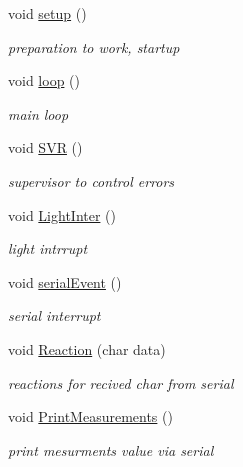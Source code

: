 \begin{DoxyCompactItemize}
\item 
\mbox{\label{_arduino_8ino_a4fc01d736fe50cf5b977f755b675f11d}} 
void \hyperlink{_arduino_8ino_a4fc01d736fe50cf5b977f755b675f11d}{setup} ()
\begin{DoxyCompactList}\small\item\em preparation to work, startup \end{DoxyCompactList}\item 
\mbox{\label{_arduino_8ino_afe461d27b9c48d5921c00d521181f12f}} 
void \hyperlink{_arduino_8ino_afe461d27b9c48d5921c00d521181f12f}{loop} ()
\begin{DoxyCompactList}\small\item\em main loop \end{DoxyCompactList}\item 
\mbox{\label{_arduino_8ino_ab68e0fadbdf08bac0bac225684590691}} 
void \hyperlink{_arduino_8ino_ab68e0fadbdf08bac0bac225684590691}{S\+VR} ()
\begin{DoxyCompactList}\small\item\em supervisor to control errors \end{DoxyCompactList}\item 
\mbox{\label{_arduino_8ino_a0fa4431e3bcdb9b59211aa7b7cb0c913}} 
void \hyperlink{_arduino_8ino_a0fa4431e3bcdb9b59211aa7b7cb0c913}{Light\+Inter} ()
\begin{DoxyCompactList}\small\item\em light intrrupt \end{DoxyCompactList}\item 
\mbox{\label{_arduino_8ino_aa11606a63bbe57842b51321e714a8daf}} 
void \hyperlink{_arduino_8ino_aa11606a63bbe57842b51321e714a8daf}{serial\+Event} ()
\begin{DoxyCompactList}\small\item\em serial interrupt \end{DoxyCompactList}\item 
void \hyperlink{_arduino_8ino_a3640ee72ee61eaba275b032cfce4f023}{Reaction} (char data)
\begin{DoxyCompactList}\small\item\em reactions for recived char from serial \end{DoxyCompactList}\item 
\mbox{\label{_arduino_8ino_a6d27cb0438359d299b4e536208457cc9}} 
void \hyperlink{_arduino_8ino_a6d27cb0438359d299b4e536208457cc9}{Print\+Measurements} ()
\begin{DoxyCompactList}\small\item\em print mesurments value via serial \end{DoxyCompactList}\end{DoxyCompactItemize}
